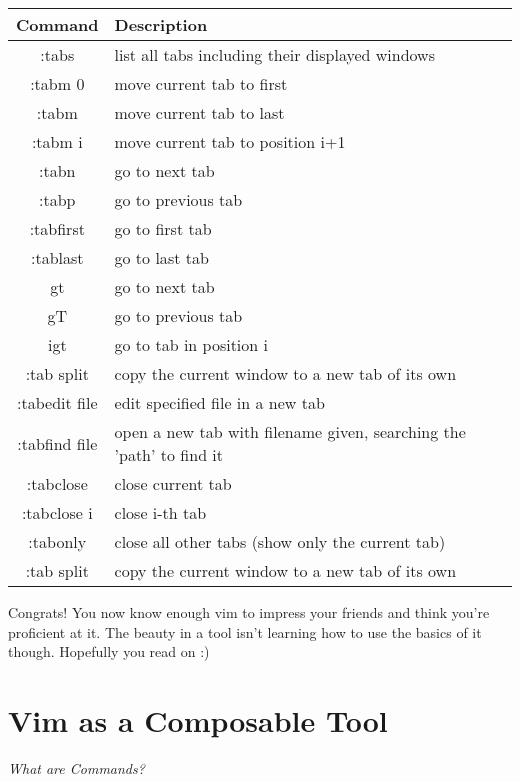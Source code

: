 \documentclass[12pt, letterpaper]{article}
\begin{document}
\begin{table}[H]
    \begin{tabular}{|c|p{9cm}|}
        Command & Description \\
        \hline
        :tabs & list all tabs including their displayed windows \\
        \hline
        :tabm 0 & move current tab to first \\
        \hline
        :tabm & move current tab to last \\
        \hline
        :tabm {i} & move current tab to position i+1 \\
        \hline
        :tabn & go to next tab \\
        \hline
        :tabp & go to previous tab \\
        \hline
        :tabfirst & go to first tab \\
        \hline
        :tablast & go to last tab \\
        \hline
        gt & go to next tab \\
        \hline
        gT & go to previous tab \\
        \hline
        {i}gt & go to tab in position i \\
        \hline
        :tab split & copy the current window to a new tab of its own \\
        \hline
        :tabedit {file} & edit specified file in a new tab \\
        \hline
        :tabfind {file} & open a new tab with filename given, searching the 'path' to find it \\
        \hline
        :tabclose & close current tab \\
        \hline
        :tabclose {i} & close i-th tab \\
        \hline
        :tabonly & close all other tabs (show only the current tab) \\
        \hline
        :tab split & copy the current window to a new tab of its own \\
        \hline
    \end{tabular}
\end{table}

Congrats! You now know enough vim to impress your friends and think you're proficient at it. The beauty in a tool isn't learning how to use the basics of it though. Hopefully you read on :)


\section{Vim as a Composable Tool}
\textit{What are Commands?}
\end{document}

